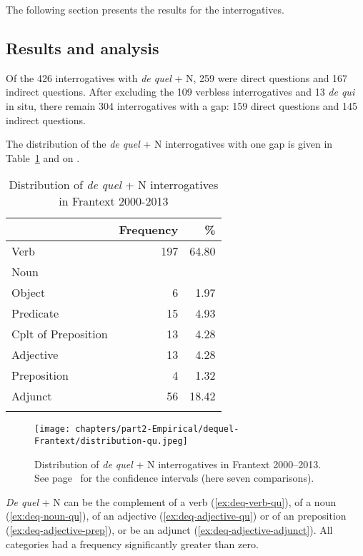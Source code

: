 The following section presents the results for the interrogatives.

\subsection{Results and analysis}

Of the 426 interrogatives with \emph{de quel} + N, 259 were direct questions and 167 indirect questions. After excluding the 109 verbless interrogatives and 13 \emph{de qui} in situ, there remain 304 interrogatives with a gap: 159 direct questions and 145 indirect questions.

The distribution of the \emph{de quel} + N interrogatives with one gap is given in Table~\ref{tab:deq-wh} and on .

\begin{table}
    \begin{tabular}{lrr}
         \lsptoprule
         & Frequency & \% \\
         \midrule
         Verb & 197 & 64.80 \\
         Noun & & \\
             \quad Object & 6 & 1.97 \\
             \quad Predicate & 15 & 4.93 \\
             \quad Cplt of Preposition & 13 & 4.28 \\
         Adjective & 13 & 4.28 \\
         Preposition & 4 & 1.32 \\
         Adjunct & 56 & 18.42 \\
         \lspbottomrule
    \end{tabular}
    \caption{Distribution of \emph{de quel} + N interrogatives in Frantext 2000-2013}
    \label{tab:deq-wh}
\end{table}

\begin{figure}
    \centering
    \texttt{[image: chapters/part2-Empirical/dequel-Frantext/distribution-qu.jpeg]}
    \caption[Distribution of \emph{de quel} + N interrogatives in Frantext 2000--2013]{Distribution of \emph{de quel} + N interrogatives in Frantext 2000--2013. See page~\pageref{ch:conf-intervals-binomial} for the confidence intervals (here seven comparisons).}
    \label{fig:deq-wh}
\end{figure}

\emph{De quel} + N can be the complement of a verb (\ref{ex:deq-verb-qu}), of a noun (\ref{ex:deq-noun-qu}), of an adjective (\ref{ex:deq-adjective-qu}) or of an preposition (\ref{ex:deq-adjective-prep}), or be an adjunct (\ref{ex:deq-adjective-adjunct}). All categories had a frequency significantly greater than zero.

